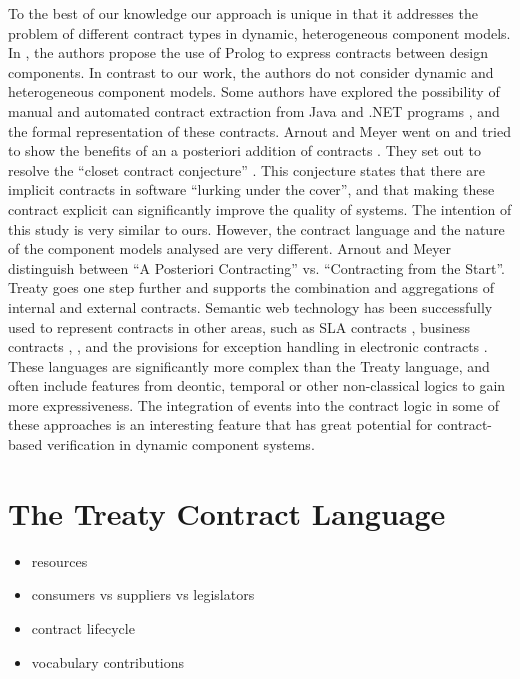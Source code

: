 \documentclass{llncs}
\begin{document}
To the best of our knowledge our approach is unique in that it addresses the
problem of different contract types in dynamic, heterogeneous component models. 
In \cite{Dong2003}, the authors propose the use of Prolog to express contracts
between design components. In contrast to our work, the authors do not consider
dynamic and heterogeneous component models. Some authors have explored the
possibility of manual and automated contract extraction from Java
\cite{Henkel03,MilanovicMalek2004} and .NET programs \cite{ArnoutMeyer2003a},
and the formal representation of these contracts. Arnout and Meyer went on and
tried to show the benefits of an a posteriori addition of contracts
\cite{ArnoutMeyer2003b}. They set out to resolve the ``closet contract
conjecture'' \cite{ArnoutMeyer2003b}. This conjecture states that there are
implicit contracts in software ``lurking under the cover'', and that making
these contract explicit can significantly improve the quality of systems. The
intention of this study is very similar to ours. However, the contract language
and the nature of the component models analysed are very different. Arnout and
Meyer distinguish between ``A Posteriori Contracting'' vs. ``Contracting from
the Start''. Treaty goes one step further and supports the combination and
aggregations of internal and external contracts. 
Semantic web technology has been successfully used to represent contracts in
other areas, such as SLA contracts \cite{PaschkeDietrich2005}, business
contracts \cite{Linington04}, \cite{Governatori06} ,\cite{Governatori05} and
the provisions for exception handling in electronic contracts \cite{SweetDeal}.
These languages are significantly more complex than the Treaty language, and
often include features from deontic, temporal or other non-classical logics to
gain more expressiveness. The integration of events into the contract logic in
some of these approaches is an interesting feature that has great potential for
contract-based verification in dynamic component systems. 


\section{The Treaty Contract Language}

\begin{itemize}
\item resources
\item consumers vs suppliers vs legislators
\item contract lifecycle
\item vocabulary contributions
\end{itemize}
\end{document}
